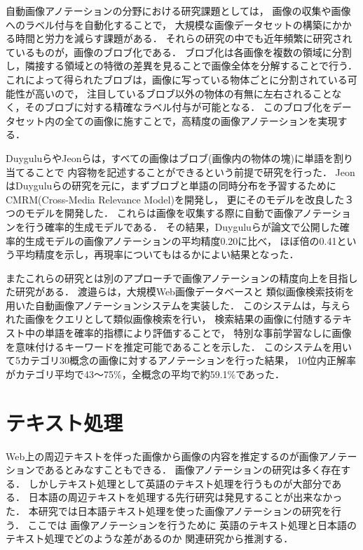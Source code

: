 自動画像アノテーションの分野における研究課題としては，
画像の収集や画像へのラベル付与を自動化することで，
大規模な画像データセットの構築にかかる時間と労力を減らす課題がある．
%
それらの研究の中でも近年頻繁に研究されているものが，画像のブロブ化である．
ブロブ化は各画像を複数の領域に分割し，隣接する領域との特徴の差異を見ることで画像全体を分解することで行う．
これによって得られたブロブは，画像に写っている物体ごとに分割されている可能性が高いので，
注目しているブロブ以外の物体の有無に左右されることなく，そのブロブに対する精確なラベル付与が可能となる．
このブロブ化をデータセット内の全ての画像に施すことで，高精度の画像アノテーションを実現する．

Duygulu\cite{duygulu}らやJeon\cite{jeon}らは，すべての画像はブロブ(画像内の物体の塊)に単語を割り当てることで
内容物を記述することができるという前提で研究を行った．
JeonはDuyguluらの研究を元に，まずブロブと単語の同時分布を予習するためにCMRM(Cross-Media Relevance Model)を開発し，
更にそのモデルを改良した３つのモデルを開発した．
これらは画像を収集する際に自動で画像アノテーションを行う確率的生成モデルである．
その結果，Duyguluらが論文で公開した確率的生成モデルの画像アノテーションの平均精度0.20に比べ，
ほぼ倍の0.41という平均精度を示し，再現率についてもはるかによい結果となった．

またこれらの研究とは別のアプローチで画像アノテーションの精度向上を目指した研究がある．
渡邉ら\cite{watanabe}は，大規模Web画像データベースと
類似画像検索技術を用いた自動画像アノテーションシステムを実装した．
このシステムは，与えられた画像をクエリとして類似画像検索を行い，
検索結果の画像に付随するテキスト中の単語を確率的指標により評価することで，
特別な事前学習なしに画像を意味付けるキーワードを推定可能であることを示した．
このシステムを用いて5カテゴリ30概念の画像に対するアノテーションを行った結果，
10位内正解率がカテゴリ平均で43～75\%，全概念の平均で約59.1\%であった．

\section{テキスト処理}

Web上の周辺テキストを伴った画像から画像の内容を推定するのが画像アノテーションであるとみなすこともできる．
画像アノテーションの研究は多く存在する．
しかしテキスト処理として英語のテキスト処理を行うものが大部分である．
日本語の周辺テキストを処理する先行研究は発見することが出来なかった．
本研究では日本語テキスト処理を使った画像アノテーションの研究を行う．
%
ここでは
画像アノテーションを行うために
英語のテキスト処理と日本語のテキスト処理でどのような差があるのか
関連研究から推測する．

